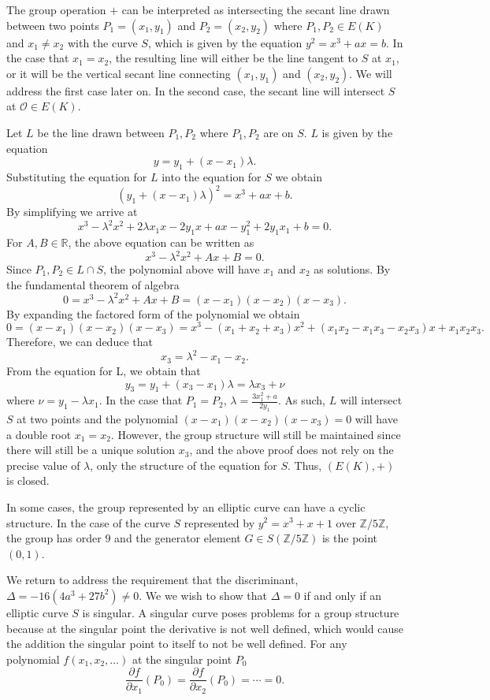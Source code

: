 \documentclass{article}
\begin{document}
\indent The group operation $+$ can be interpreted as intersecting the secant line drawn between two points $P_1=(x_1,y_1)$ and $P_2=(x_2,y_2)$ where $P_1,P_2 \in E(K)$ and $x_1 \neq x_2$ with the curve $S$, which is given by the equation $y^2=x^3+ax=b$. In the case that $x_1=x_2$, the resulting line will either be the line tangent to $S$ at $x_1$, or it will be the vertical secant line connecting $(x_1,y_1)$ and $(x_2,y_2)$. We will address the first case later on. In the second case, the secant line will intersect $S$ at $\mathcal{O} \in E(K)$.

\indent Let $L$ be the line drawn between $P_1,P_2$ where $P_1,P_2$ are on $S$. $L$ is given by the equation
$$y=y_1+(x-x_1)\lambda.$$
Substituting the equation for $L$ into the equation for $S$ we obtain
$$(y_1+(x-x_1)\lambda)^2=x^3+ax+b.$$
By simplifying we arrive at
$$x^3-\lambda^2 x^2+2\lambda x_1x-2y_1x+ax-y_1^2+2y_1x_1+b=0.$$
For $A,B\in\mathbb{R}$, the above equation can be written as
$$x^3-\lambda^2 x^2+Ax+B=0.$$
Since $P_1,P_2 \in L \cap S$, the polynomial above will have $x_1$ and $x_2$ as solutions. By the fundamental theorem of algebra
$$0=x^3-\lambda^2 x^2+Ax+B=(x-x_1)(x-x_2)(x-x_3).$$
By expanding the factored form of the polynomial we obtain
$$0=(x-x_1)(x-x_2)(x-x_3)=x^3-(x_1+x_2+x_3)x^2+(x_1x_2-x_1x_3-x_2x_3)x+x_1x_2x_3.$$
Therefore, we can deduce that
$$x_3=\lambda^2-x_1-x_2.$$
From the equation for L, we obtain that
$$y_3=y_1+(x_3-x_1)\lambda=\lambda x_3+\nu$$
where $\nu=y_1-\lambda x_1$. In the case that $P_1=P_2$, $\lambda=\frac{3x_1^2+a}{2y_1}$. As such, $L$ will intersect $S$ at two points and the polynomial $(x-x_1)(x-x_2)(x-x_3)=0$ will have a double root $x_1=x_2$. However, the group structure will still be maintained since there will still be a unique solution $x_3$, and the above proof does not rely on the precise value of  $\lambda$, only the structure of the equation for $S$. Thus, $(E(K),+)$ is closed.

\indent In some cases, the group represented by an elliptic curve can have a cyclic structure. In the case of the curve $S$ represented by $y^2=x^3+x+1$ over $\mathbb{Z}/5\mathbb{Z}$, the group has order $9$ and the generator element $G \in S(\mathbb{Z}/5\mathbb{Z})$ is the point $(0,1)$.

\indent We return to address the requirement that the discriminant, $\Delta=-16(4a^3+27b^2) \neq 0$. We we wish to show that $\Delta=0$ if and only if an elliptic curve $S$ is singular. A singular curve poses problems for a group structure because at the singular point the derivative is not well defined, which would cause the addition the singular point to itself to not be well defined. For any polynomial $f(x_1,x_2,\dotsc)$ at the singular point $P_0$
$$\frac{\partial f}{\partial x_1}(P_0)=\frac{\partial f}{\partial x_2}(P_0)=\cdots=0.$$
\end{document}
